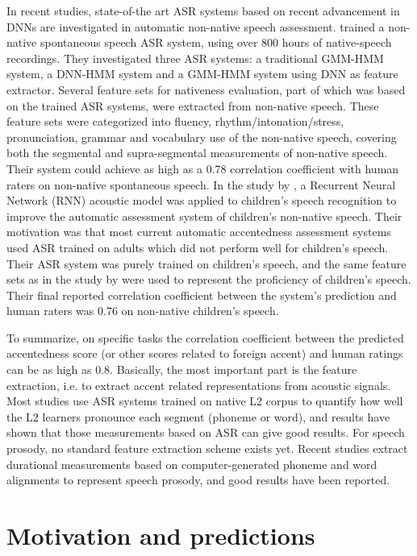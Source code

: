 In recent studies, state-of-the art ASR systems based on recent advancement in DNNs are investigated in automatic non-native speech assessment. \cite{tao2016exploring} trained a non-native spontaneous speech ASR system, using over 800 hours of native-speech recordings. They investigated three ASR systems: a traditional GMM-HMM system, a DNN-HMM system and a GMM-HMM system using DNN as feature extractor. Several feature sets for nativeness evaluation, part of which was based on the trained ASR systems, were extracted from non-native speech. These feature sets were categorized into fluency, rhythm/intonation/stress, pronunciation, grammar and vocabulary use of the non-native speech, covering both the segmental and supra-segmental measurements of non-native speech. Their system could achieve as high as a 0.78 correlation coefficient with human raters on non-native spontaneous speech. In the study by \cite{qian2017bidirectional}, a Recurrent Neural Network (RNN) acoustic model was applied to children's speech recognition to improve the automatic assessment system of children's non-native speech. Their motivation was that most current automatic accentedness assessment systems used ASR trained on adults which did not perform well for children's speech. Their ASR system was purely trained on children's speech, and the same feature sets as in the study by \cite{tao2016exploring} were used to represent the proficiency of children's speech. Their final reported correlation coefficient between the system's prediction and human raters was 0.76 on non-native children's speech.

To summarize, on specific tasks the correlation coefficient between the predicted accentedness score (or other scores related to foreign accent) and human ratings can be as high as 0.8. Basically, the most important part is the feature extraction, i.e. to extract accent related representations from acoustic signals. Most studies use ASR systems trained on native L2 corpus to quantify how well the L2 learners pronounce each segment (phoneme or word), and results have shown that those measurements based on ASR can give good results. For speech prosody, no standard feature extraction scheme exists yet. Recent studies extract durational measurements based on computer-generated phoneme and word alignments to represent speech prosody, and good results have been reported.

\section{Motivation and predictions}

